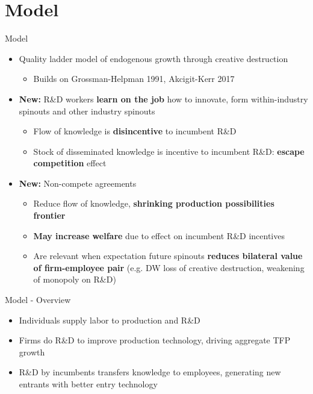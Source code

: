 \documentclass[english,usenames,dvipsnames]{beamer}
\begin{document}
\section{Model}

\begin{frame}
\tableofcontents[currentsection]
\end{frame}

\begin{frame}{Model}
\begin{itemize}	
\item Quality ladder model of endogenous growth through creative destruction 
\begin{itemize}
	\item Builds on Grossman-Helpman 1991, Akcigit-Kerr 2017 
\end{itemize}
\item \alert{\textbf{New:}} R\&D workers \textbf{\alert{learn on the job}} how to innovate, form within-industry spinouts and other industry spinouts
\begin{itemize}
	\item Flow of knowledge is \textbf{\alert{disincentive}} to incumbent R\&D
	\item Stock of disseminated knowledge is incentive to incumbent R\&D: \textbf{\alert{escape competition}} effect
\end{itemize} 
\item \alert{\textbf{New:}} Non-compete agreements
\begin{itemize}
	\item Reduce flow of knowledge, \textbf{\alert{shrinking production possibilities frontier}}
	\item \textbf{\alert{May increase welfare}} due to effect on incumbent R\&D incentives
	\item Are relevant when expectation future spinouts \textbf{\alert{reduces bilateral value of firm-employee pair}} (e.g. DW loss of creative destruction, weakening of monopoly on R\&D)
\end{itemize}
\end{itemize}
\end{frame}

\begin{frame}{Model - Overview}
\begin{itemize}
\item Individuals supply labor to production and R\&D
\item Firms do R\&D to improve production technology, driving aggregate TFP growth
\item R\&D by incumbents transfers knowledge to employees, generating new entrants with better entry technology

\end{itemize}
\end{frame}
\end{document}
